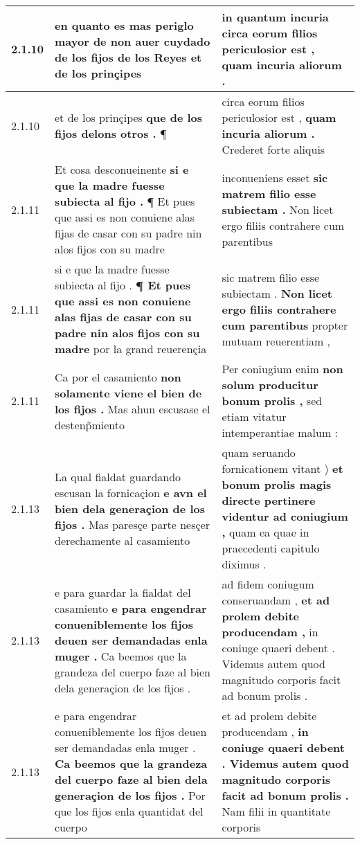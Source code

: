 \begin{tabular}{|p{1cm}|p{6.5cm}|p{6.5cm}|}
2.1.10 & en quanto es mas periglo mayor \textbf{ de non auer cuydado de los fijos de los Reyes } et de los prinçipes & in quantum incuria \textbf{ circa eorum filios periculosior est , } quam incuria aliorum . \\\hline
2.1.10 & et de los prinçipes \textbf{ que de los fijos delons otros . } ¶ & circa eorum filios periculosior est , \textbf{ quam incuria aliorum . } Crederet forte aliquis \\\hline
2.1.11 & Et cosa desconueinente \textbf{ si e que la madre fuesse subiecta al fijo . } ¶ Et pues que assi es non conuiene alas fijas de casar con su padre nin alos fijos con su madre & inconueniens esset \textbf{ sic matrem filio esse subiectam . } Non licet ergo filiis contrahere cum parentibus \\\hline
2.1.11 & si e que la madre fuesse subiecta al fijo . \textbf{ ¶ Et pues que assi es non conuiene alas fijas de casar con su padre nin alos fijos con su madre } por la grand reuerençia & sic matrem filio esse subiectam . \textbf{ Non licet ergo filiis contrahere cum parentibus } propter mutuam reuerentiam , \\\hline
2.1.11 & Ca por el casamiento \textbf{ non solamente viene el bien de los fijos . } Mas ahun escusase el destenp̃miento & Per coniugium enim \textbf{ non solum producitur bonum prolis , } sed etiam vitatur intemperantiae malum : \\\hline
2.1.13 & La qual fialdat guardando escusan la fornicaçion \textbf{ e avn el bien dela generaçion de los fijos . } Mas paresçe parte nesçer derechamente al casamiento & quam seruando fornicationem vitant ) \textbf{ et bonum prolis magis directe pertinere videntur ad coniugium , } quam ea quae in praecedenti capitulo diximus . \\\hline
2.1.13 & e para guardar la fialdat del casamiento \textbf{ e para engendrar conueniblemente los fijos deuen ser demandadas enla muger . } Ca beemos que la grandeza del cuerpo faze al bien dela generaçion de los fijos . & ad fidem coniugum conseruandam , \textbf{ et ad prolem debite producendam , } in coniuge quaeri debent . Videmus autem quod magnitudo corporis facit ad bonum prolis . \\\hline
2.1.13 & e para engendrar conueniblemente los fijos deuen ser demandadas enla muger . \textbf{ Ca beemos que la grandeza del cuerpo faze al bien dela generaçion de los fijos . } Por que los fijos enla quantidat del cuerpo & et ad prolem debite producendam , \textbf{ in coniuge quaeri debent . Videmus autem quod magnitudo corporis facit ad bonum prolis . } Nam filii in quantitate corporis \\\hline

\end{tabular}
